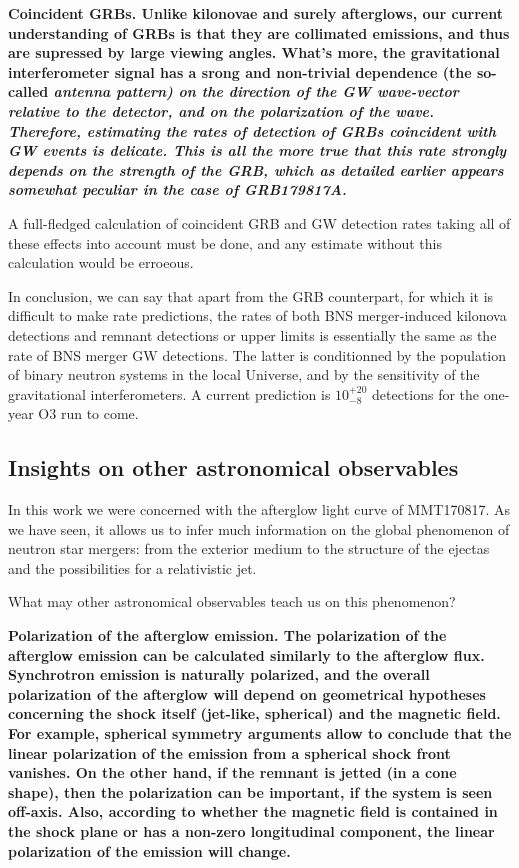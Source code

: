 \bf{Coincident GRBs. }Unlike kilonovae and surely afterglows, our current understanding of GRBs is that they are collimated emissions, and thus are supressed by large viewing angles. What's more, the gravitational interferometer signal has a srong and non-trivial dependence (the so-called \it{antenna pattern}) on the direction of the GW wave-vector relative to the detector, and on the polarization of the wave. Therefore, estimating the rates of detection of GRBs coincident with GW events is delicate. This is all the more true that this rate strongly depends on the strength of the GRB, which as detailed earlier appears somewhat peculiar in the case of GRB179817A.

A full-fledged calculation of coincident GRB and GW detection rates taking all of these effects into account must be done, and any estimate without this calculation would be erroeous.

In conclusion, we can say that apart from the GRB counterpart, for which it is difficult to make rate predictions, the rates of both BNS merger-induced kilonova detections and remnant detections or upper limits is essentially the same as the rate of BNS merger GW detections. The latter is conditionned by the population of binary neutron systems in the local Universe, and by the sensitivity of the gravitational interferometers. A current prediction is $10^{+20}_{-8}$ detections for the one-year O3 run to come.

\subsection{Insights on other astronomical observables}

In this work we were concerned with the afterglow light curve of MMT170817. As we have seen, it allows us to infer much information on the global phenomenon of neutron star mergers: from the exterior medium to the structure of the ejectas and the possibilities for a relativistic jet.

What may other astronomical observables teach us on this phenomenon?



\bf{Polarization of the afterglow emission.} The polarization of the afterglow emission can be calculated similarly to the afterglow flux. Synchrotron emission is naturally polarized, and the overall polarization of the afterglow will depend on geometrical hypotheses concerning the shock itself (jet-like, spherical) and the magnetic field. For example, spherical symmetry arguments allow to conclude that the linear polarization of the emission from  a spherical shock front vanishes. On the other hand, if the remnant is jetted (in a cone shape), then the polarization can be important, if the system is seen off-axis. Also, according to whether the magnetic field is contained in the shock plane or has a non-zero longitudinal component, the linear polarization of the emission will change.

